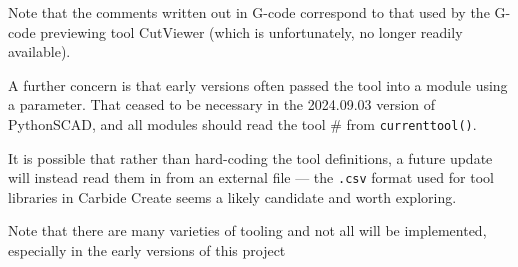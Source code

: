 \documentclass{ltxdoc}
\begin{document}
Note that the comments written out in G-code correspond to that used by the G-code previewing tool 
CutViewer (which is unfortunately, no longer readily available).

A further concern is that early versions often passed the tool into a module using a parameter.
That ceased to be necessary in the 2024.09.03 version of PythonSCAD, and all modules should 
read the tool \# from \verb|currenttool()|. 

It is possible that rather than hard-coding the tool definitions, a future update will instead
read them in from an external file --- the \texttt{.csv} format used for tool libraries in 
Carbide Create seems a likely candidate and worth exploring.

Note that there are many varieties of tooling and not all will be implemented, especially in the 
early versions of this project
 
\end{document}
